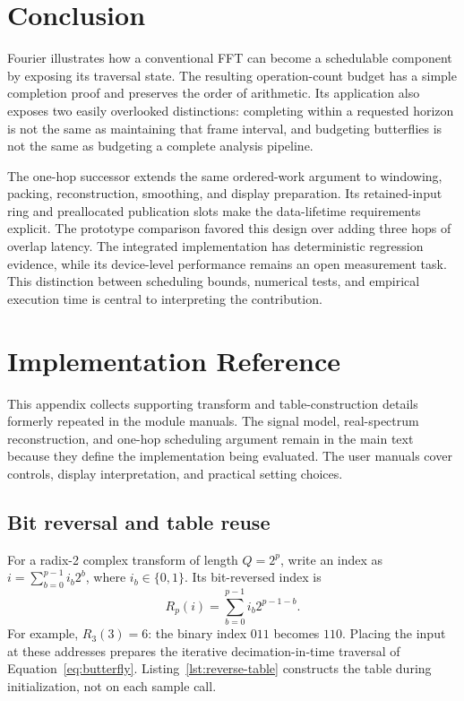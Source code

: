 \documentclass[11pt,letterpaper]{article}
\begin{document}
\section{Conclusion}
Fourier illustrates how a conventional FFT can become a schedulable component
by exposing its traversal state. The resulting operation-count budget has a
simple completion proof and preserves the order of arithmetic. Its application
also exposes two easily overlooked distinctions: completing within a requested
horizon is not the same as maintaining that frame interval, and budgeting
butterflies is not the same as budgeting a complete analysis pipeline.

The one-hop successor extends the same ordered-work argument to windowing,
packing, reconstruction, smoothing, and display preparation. Its retained-input
ring and preallocated publication slots make the data-lifetime requirements
explicit. The prototype comparison favored this design over adding three hops
of overlap latency. The integrated implementation has deterministic regression
evidence, while its device-level performance remains an open measurement task.
This distinction between scheduling bounds, numerical tests, and empirical
execution time is central to interpreting the contribution.

\appendix
\section{Implementation Reference}
\label{app:implementation}
This appendix collects supporting transform and table-construction details
formerly repeated in the module manuals. The signal model, real-spectrum
reconstruction, and one-hop scheduling argument remain in the main text
because they define the implementation being evaluated. The user manuals
cover controls, display interpretation, and practical setting choices.

\subsection{Bit reversal and table reuse}
For a radix-2 complex transform of length $Q=2^p$, write an index as
$i=\sum_{b=0}^{p-1}i_b2^b$, where $i_b\in\{0,1\}$. Its bit-reversed index is
\begin{equation}
 R_p(i)=\sum_{b=0}^{p-1}i_b2^{p-1-b}.
 \label{eq:reverse-index}
\end{equation}
For example, $R_3(3)=6$: the binary index $011$ becomes $110$. Placing the
input at these addresses prepares the iterative decimation-in-time traversal
of Equation~\eqref{eq:butterfly}. Listing~\ref{lst:reverse-table} constructs
the table during initialization, not on each sample call.
\end{document}
